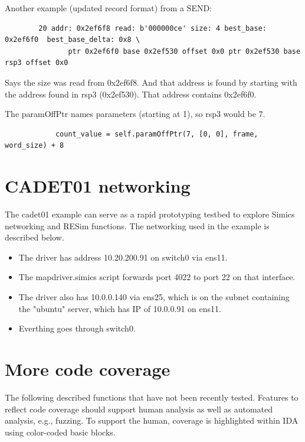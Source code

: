 \documentclass[titlepage]{article}
\begin{document}
\begin{appendices}
Another example (updated record format) from a SEND:
\begin{verbatim}
        20 addr: 0x2ef6f8 read: b'000000ce' size: 4 best_base: 0x2ef6f0  best_base_delta: 0x8 \
               ptr 0x2ef6f0 base 0x2ef530 offset 0x0 ptr 0x2ef530 base rsp3 offset 0x0
\end{verbatim}
Says the size was read from 0x2ef6f8.  And that address is found by starting with the address found in rsp3 (0x2ef530).
That address contains 0x2ef6f0. 

The paramOffPtr names parameters (starting at 1), so rsp3 would be 7. 
\begin{verbatim}
            count_value = self.paramOffPtr(7, [0, 0], frame, word_size) + 8
\end{verbatim}



\section{CADET01 networking}
The cadet01 example can serve as a rapid prototyping testbed to explore Simics networking and RESim functions.
The networking used in the example is described below.
\begin{itemize}
\item The driver has address 10.20.200.91 on switch0 via ens11.  
\item The mapdriver.simics script forwards port 4022 to
port 22 on that interface.  
\item The driver also has 10.0.0.140 via ens25, which is on the subnet containing the
"ubuntu" server, which has IP of 10.0.0.91 on ens11.  
\item Everthing goes through switch0.
\end{itemize}

\section{More code coverage}
The following described functions that have not been recently tested.
Features to reflect code coverage should support human analysis as well as automated analysis, e.g., fuzzing.  To support the human, coverage is highlighted within IDA using color-coded basic blocks.  


\end{appendices}
\end{document}

